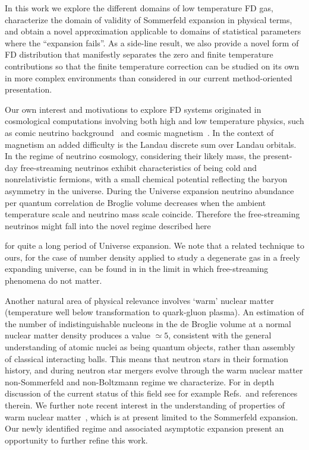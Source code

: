 \documentclass[sn-mathphys,Numbered]{sn-jnl}
\newcommand*{\xred}{\color{black}}
\begin{document}
In this work we explore the different domains of low temperature FD gas, characterize the domain of validity of Sommerfeld expansion in physical terms, and obtain a novel approximation applicable to domains of statistical parameters where the ``expansion fails''. As a side-line result, we also provide a novel form of FD distribution that manifestly separates the zero and finite temperature contributions so that the finite temperature correction can be studied on its own in more complex environments than considered in our current method-oriented presentation. 

Our own interest and motivations to explore FD systems originated in cosmological computations involving both high and low temperature physics, such as comic neutrino background~\cite{Birrell:2013gpa,Birrell:2012gg} and cosmic magnetism~\cite{Steinmetz:2023nsc}. In the context of magnetism an added difficulty is the Landau discrete sum over Landau orbitals. In the regime of neutrino cosmology, considering their likely mass, the present-day free-streaming neutrinos exhibit characteristics of being cold and nonrelativistic fermions, with a small chemical potential reflecting the baryon asymmetry in the universe. During the Universe expansion neutrino abundance per quantum correlation de Broglie volume decreases {\xred when the ambient temperature scale and neutrino mass scale coincide}. Therefore the free-streaming neutrinos might fall into the novel regime described here {\xred for quite a long period of Universe expansion. We note that a related technique to ours, for the case of number density applied to study a degenerate gas in a freely expanding universe, can be found in \cite{Trautner:2016ias} in the limit in which free-streaming phenomena do not matter. 

Another natural area of physical relevance involves `warm' nuclear matter (temperature well below transformation to quark-gluon plasma). An estimation of the number of indistinguishable nucleons in the de Broglie volume at a normal nuclear matter density produces a value $\simeq 5$, consistent with the general understanding of atomic nuclei as being quantum objects, rather than assembly of classical interacting balls. This means that neutron stars in their formation history, and during neutron star mergers evolve through the warm nuclear matter non-Sommerfeld and non-Boltzmann regime we characterize. For in depth discussion of the current status of this field see for example Refs.\,\cite{Oertel:2016bki,Perego:2019adq,MUSES:2023hyz} and references therein. We further note recent interest in the understanding of properties of warm nuclear matter~\cite{Mroczek:2024sfp}, which is at present limited to the Sommerfeld expansion. Our newly identified regime and associated asymptotic expansion present an opportunity to further refine this work.
 
}
\end{document}

